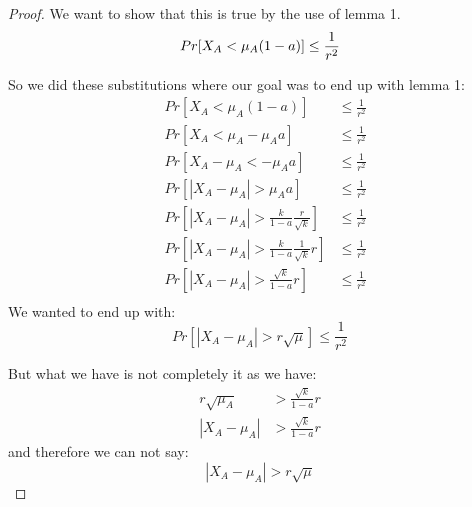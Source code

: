 \begin{proof}
    We want to show that this is true by the use of lemma 1.
    \begin{equation*}
        Pr[X_A < \mu_A(1-a)] \le \frac{1}{r^2}\\
    \end{equation*}

    So we did these substitutions where our goal was to end up with lemma 1:
    \begin{align*}
        &Pr[X_A < \mu_A(1-a)] &\le \frac{1}{r^2}\\
        &Pr[X_A < \mu_A - \mu_A a] &\le \frac{1}{r^2}\\
        &Pr[X_A - \mu_A < - \mu_A a] &\le \frac{1}{r^2}\\
        &Pr[|X_A - \mu_A| > \mu_A a] &\le \frac{1}{r^2}\\
        &Pr[|X_A - \mu_A| > \frac{k}{1-a} \frac{r}{\sqrt{k}}]   &\le \frac{1}{r^2}\\
        &Pr[|X_A - \mu_A| > \frac{k}{1-a} \frac{1}{\sqrt{k}} r] &\le \frac{1}{r^2}\\
        &Pr[|X_A - \mu_A| > \frac{\sqrt{k}}{1-a} r]&\le \frac{1}{r^2}\\
    \end{align*}
    We wanted to end up with:
    \begin{equation*}
        Pr[|X_A - \mu_A| > r \sqrt{\mu}] \le \frac{1}{r^2}
    \end{equation*}

    But what we have is not completely it as we have:
    \begin{align*}
        r \sqrt{\mu_A} &> \frac{\sqrt{k}}{1-a} r\\
        |X_A - \mu_A| &> \frac{\sqrt{k}}{1-a} r
    \end{align*}
    and therefore we can not say:
    \begin{equation*}
        |X_A - \mu_A| > r \sqrt{\mu}
    \end{equation*}


\end{proof}
